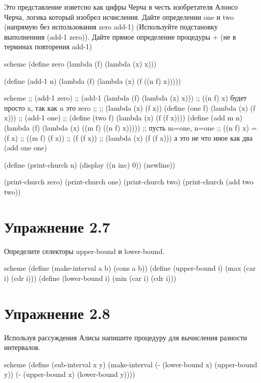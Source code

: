 Это представление изветсно как цифры Черча в честь изобретателя Алонсо Черча, логика который изобрел исчисления. Дайте определении one и two (напрямую без использования zero add-1) (Используйте подстановку выполненния (add-1 zero)). Дайте прямое определение процедуры + (не в терминах повторения add-1)

\begin{codelisting}{scheme}
(define zero (lambda (f) (lambda (x) x)))

(define (add-1 n)
  (lambda (f) (lambda (x) (f ((n f) x)))))
\end{codelisting}

\begin{codelisting}{scheme}
;; (add-1 zero)
;; (add-1 (lambda (f) (lambda (x) x)))
;; ((n f) x) будет просто x, так как n это zero
;;
;; (lambda (x) (f x))
(define (one f)
  (lambda (x) (f x)))
;; (add-1 one)
;;
(define (two f)
  (lambda (x) (f (f x))))
(define (add m n)
  (lambda (f) (lambda (x) ((m f) ((n f) x)))))
;; пусть m=one, n=one
;; ((n f) x) = (f x)
;; ((m f) (f x))
;; (f (f x))
;; (lambda (x) (f (f x))) а это не что иное как два
(add one one)

(define (print-church n)
  (display ((n inc) 0)) (newline))

(print-church zero)
(print-church one)
(print-church two)
(print-church (add two two))
\end{codelisting}

\chapter{Упражнение 2.7}

Определите селекторы upper-bound и lower-bound.

\begin{codelisting}{scheme}
(define (make-interval a b) (cons a b))
(define (upper-bound i) (max (car i) (cdr i)))
(define (lower-bound i) (min (car i) (cdr i)))
\end{codelisting}

\chapter{Упражнение 2.8}

Используя рассуждения Алисы напишите процедуру для вычисления разности интервалов.

\begin{codelisting}{scheme}
(define (sub-interval x y)
  (make-interval (- (lower-bound x) (upper-bound y))
                 (- (upper-bound x) (lower-bound y))))
\end{codelisting}

